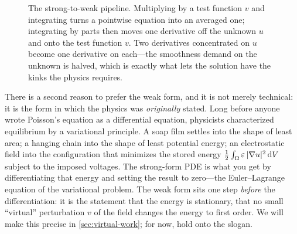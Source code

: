 \begin{figure}[t]
\centering
{}
\caption[Strong to weak: spreading the derivative]{The strong-to-weak pipeline.
Multiplying by a test function $v$ and integrating turns a pointwise equation
into an averaged one; integrating by parts then moves one derivative off the
unknown $u$ and onto the test function $v$. Two derivatives concentrated on $u$
become one derivative on each---the smoothness demand on the unknown is halved,
which is exactly what lets the solution have the kinks the physics requires.}
\label{fig:strongweak}
\end{figure}

There is a second reason to prefer the weak form, and it is not merely
technical: it is the form in which the physics was \emph{originally} stated.
Long before anyone wrote Poisson's equation as a differential equation,
physicists characterized equilibrium by a variational principle. A soap film
settles into the shape of least area; a hanging chain into the shape of least
potential energy; an electrostatic field into the configuration that minimizes
the stored energy $\tfrac12\int_\Omega \varepsilon\,\lvert\nabla u\rvert^2\,\mathrm{d}V$ subject to
the imposed voltages. The strong-form PDE is what you get by differentiating
that energy and setting the result to zero---the Euler--Lagrange equation of the
variational problem. The weak form sits one step \emph{before} the
differentiation: it is the statement that the energy is stationary, that no
small ``virtual'' perturbation $v$ of the field changes the energy to first
order. We will make this precise in \cref{sec:virtual-work}; for now, hold onto
the slogan.

